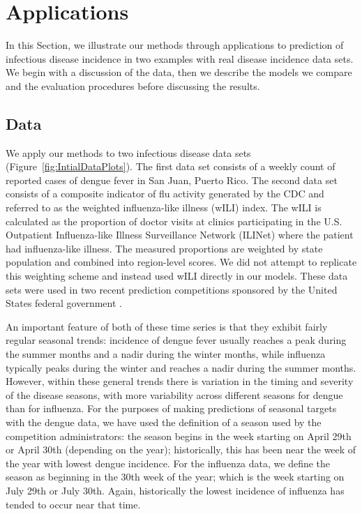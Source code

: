 \documentclass[times, doublespace]{simauth}\usepackage[]{graphicx}\usepackage[]{color}
\begin{document}


\section{Applications}
\label{sec:Applications}

In this Section, we illustrate our methods through applications to prediction
of infectious disease incidence in two examples with real disease incidence data
sets.  We begin with a discussion of the data, then we describe the models we
compare and the evaluation procedures before discussing the results.

\subsection{Data}

We apply our methods to two infectious disease data sets (Figure~\ref{fig:IntialDataPlots}).
The first data set consists of a weekly count of reported cases of dengue fever in San
Juan, Puerto Rico. The second data set consists of a composite indicator
of flu activity generated by the CDC and
referred to as the weighted influenza-like illness (wILI) index.  The
wILI is calculated as the proportion of doctor visits at
clinics participating in the U.S. Outpatient Influenza-like
Illness Surveillance Network (ILINet) where the patient had influenza-like illness.
The measured proportions are weighted by state population and combined into region-level scores.  We
did not attempt to replicate this weighting scheme and instead used wILI
directly in our models.
These data sets were used in two recent
prediction competitions sponsored by the United States federal government
\cite{PandemicPredictionandForecastingScienceandTechnologyInteragencyWorkingGroup2015Announcement,
EpidemicPredictionInitiative2015Index}.


An important feature of both of these time series is that they exhibit fairly
regular seasonal trends: incidence of dengue fever usually reaches a peak during
the summer months and a nadir during the winter months, while influenza typically
peaks during the winter and reaches a nadir during the summer months.  However,
within these general trends there is variation in the timing and
severity of the disease seasons, with more variability across different seasons
for dengue than for influenza. For the
purposes of making predictions of seasonal targets with the dengue data, we have
used the definition of a season used by the competition administrators: the
season begins in the week starting on April 29th or April 30th (depending on the
year); historically, this has been near the week of the year with lowest dengue
incidence.  For the influenza data, we define the season as beginning in the
30th week of the year; which is the week starting on July 29th or July 30th.
Again, historically the lowest incidence of influenza has tended to occur near that time.
\end{document}
